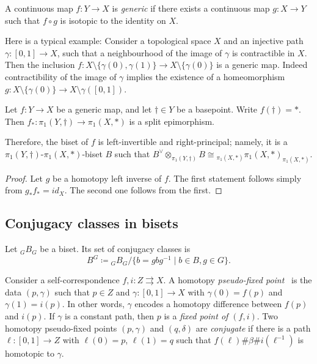 \documentclass{amsart}
\begin{document}
\begin{defn}
  A continuous map $f\colon Y\to X$ is \emph{generic} if there exists a
  continuous map $g\colon X\to Y$ such that $f\circ g$ is isotopic to the
  identity on $X$.
\end{defn}

Here is a typical example: Consider a topological space $X$ and an
injective path $\gamma\colon[0,1]\to X$, such that a neighbourhood of the
image of $\gamma$ is contractible in $X$. Then the inclusion
$f\colon X\setminus\{\gamma(0),\gamma(1)\}\to X\setminus\{\gamma(0)\}$ is a
generic map. Indeed contractibility of the image of $\gamma$ implies
the existence of a homeomorphism
$g\colon X\setminus\{\gamma(0)\}\to X\setminus\gamma([0,1])$.

\begin{lem}
  Let $f\colon Y\to X$ be a generic map, and let $\dagger\in Y$ be a
  basepoint. Write $f(\dagger)=*$. Then
  $f_*\colon\pi_1(Y,\dagger)\to\pi_1(X,*)$ is a split epimorphism.

  Therefore, the biset of $f$ is left-invertible and right-principal;
  namely, it is a $\pi_1(Y,\dagger)$-$\pi_1(X,*)$-biset $B$ such that
  $B^\vee\otimes_{\pi_1(Y,\dagger)}B\cong{}_{\pi_1(X,*)}\pi_1(X,*)_{\pi_1(X,*)}$.
\end{lem}
\begin{proof}
  Let $g$ be a homotopy left inverse of $f$. The first statement
  follows simply from $g_*f_*=id_X$. The second one follows from the
  first.
\end{proof}

\subsection{Conjugacy classes in bisets}\label{ss:cc in bisets}
Let ${}_GB_G$ be a biset. Its set of conjugacy classes is
\[B^{G}\coloneqq{}_GB_G/\{b=g b g^{-1} \mid b\in B, g\in G\}.\]

Consider a self-correspondence $f,i\colon Z\rightrightarrows X$. A homotopy
\emph{pseudo-fixed point}~\cite{ishii-smillie:shadowing} is the data
$(p,\gamma)$ such that $p \in Z$ and $\gamma\colon [0,1]\to X$ with
$\gamma(0)=f(p)$ and $\gamma(1)=i(p)$. In other words, $\gamma$ encodes a
homotopy difference between $f(p)$ and $i(p)$. If $\gamma$ is a constant
path, then $p$ is a \emph{fixed point of $(f,i)$}. Two homotopy
pseudo-fixed points $(p,\gamma)$ and $(q,\delta)$ are \emph{conjugate} if
there is a path $\ell\colon [0,1]\to Z$ with $\ell(0)=p$, $\ell(1)=q$ such
that $f(\ell)\#\beta \# i(\ell^{-1})$ is homotopic to $\gamma$.
\end{document}
